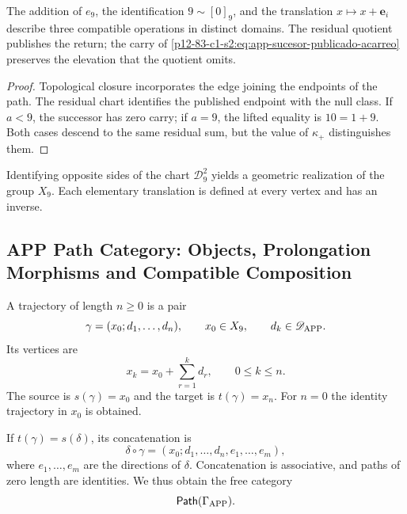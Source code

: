 \begin{lemma}
\label{p12-83-c1-s2:lem:app-compatibilidad-cierre-residuo}
The addition of \(e_9\), the identification \(9\sim[0]_9\), and the translation
\(x\mapsto x+\mathbf e_i\) describe three compatible operations in
distinct domains. The residual quotient publishes the return; the carry of
\cref{p12-83-c1-s2:eq:app-sucesor-publicado-acarreo} preserves the elevation that the
quotient omits.
\end{lemma}

\begin{proof}
Topological closure incorporates the edge joining the endpoints of the path. The
residual chart identifies the published endpoint with the null class. If
\(a<9\), the successor has zero carry; if \(a=9\), the lifted equality
is \(10=1+9\). Both cases descend to the same residual sum, but the
value of \(\kappa_+\) distinguishes them.
\end{proof}

\begin{corollary}
\label{p12-83-c1-s2:cor:app-soporte-toroidal}
Identifying opposite sides of the chart \(\mathcal D_9^2\) yields a
geometric realization of the group \(X_9\). Each elementary translation is
defined at every vertex and has an inverse.
\end{corollary}

\subsection{APP Path Category: Objects, Prolongation Morphisms and Compatible Composition}

\begin{definition}
A trajectory of length \(n\geq0\) is a pair
\[
 \gamma=(x_0;d_1,\ldots,d_n),
 \qquad
 x_0\in X_9,\qquad d_k\in\mathscr D_{\rm APP}.
\]
Its vertices are
\[
 x_k=x_0+\sum_{r=1}^k d_r,
 \qquad 0\leq k\leq n.
\]
The source is \(s(\gamma)=x_0\) and the target is
\(t(\gamma)=x_n\). For \(n=0\) the identity trajectory in
\(x_0\) is obtained.
\end{definition}

If \(t(\gamma)=s(\delta)\), its concatenation is
\[
 \delta\circ\gamma
  =(x_0;d_1,\ldots,d_n,e_1,\ldots,e_m),
\]
where \(e_1,\ldots,e_m\) are the directions of \(\delta\). Concatenation is associative, and paths of zero length are identities. We thus obtain the free category
\[
 \mathsf{Path}(\Gamma_{\rm APP}).
\]

